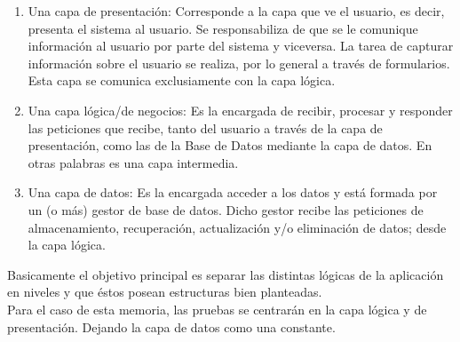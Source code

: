 \begin{enumerate}
 \item Una capa de presentación: Corresponde a la capa que ve el usuario, es decir, presenta 
  el sistema al usuario. Se responsabiliza de que se le comunique información al usuario por 
  parte del sistema y viceversa. La tarea de capturar información sobre el usuario se realiza,
  por lo general a través de formularios. Esta capa se comunica exclusiamente con la capa lógica.
  
 \item Una capa lógica/de negocios: Es la encargada de recibir, procesar y responder las peticiones
  que recibe, tanto del usuario a través de la capa de presentación, como las de la Base de Datos mediante
  la capa de datos. En otras palabras es una capa intermedia.
 
 \item Una capa de datos: Es la encargada acceder a los datos y está formada por un (o más) gestor de 
  base de datos. Dicho gestor recibe las peticiones de almacenamiento, recuperación, actualización y/o 
  eliminación de datos; desde la capa lógica. 
\end{enumerate}

Basicamente el objetivo principal es separar las distintas lógicas de la aplicación en niveles y que
éstos posean estructuras bien planteadas.\\

Para el caso de esta memoria, las pruebas se centrarán en la capa lógica y de presentación. Dejando
la capa de datos como una constante.




\newpage